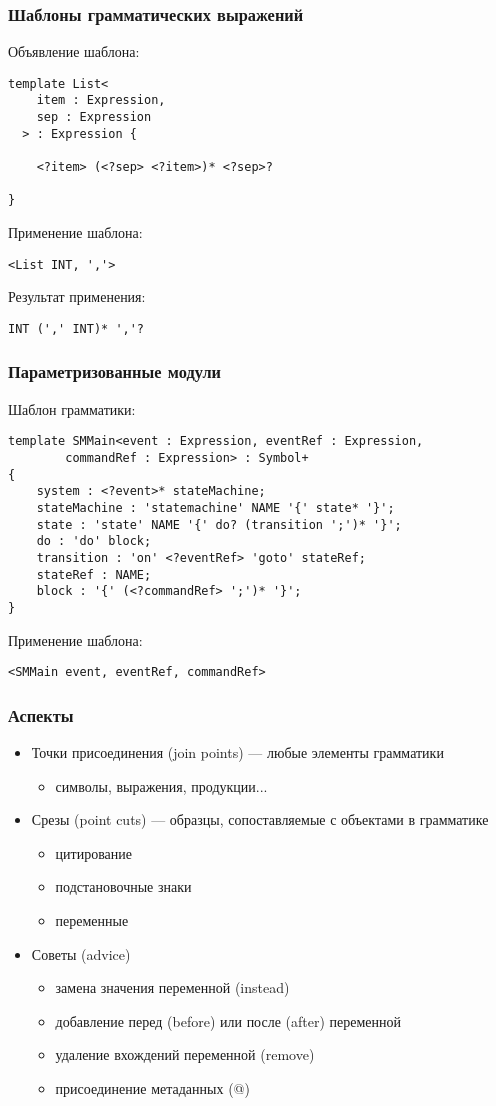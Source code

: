 \documentclass{beamer}
\begin{document}
\begin{frame}[fragile]
	\frametitle{Шаблоны грамматических выражений}
Объявление шаблона:
\begin{lstlisting}
template List<
    item : Expression, 
    sep : Expression
  > : Expression {
  
    <?item> (<?sep> <?item>)* <?sep>?
    
}
\end{lstlisting}
Применение шаблона:
\begin{lstlisting}
<List INT, ','>
\end{lstlisting}
Результат применения:
\begin{lstlisting}
INT (',' INT)* ','?
\end{lstlisting}
\end{frame}

\begin{frame}[fragile]
	\frametitle{Параметризованные модули}
Шаблон грамматики:
\begin{lstlisting}[xleftmargin=0.3cm]
template SMMain<event : Expression, eventRef : Expression, 
        commandRef : Expression> : Symbol+ 
{
    system : <?event>* stateMachine;
    stateMachine : 'statemachine' NAME '{' state* '}';
    state : 'state' NAME '{' do? (transition ';')* '}';
    do : 'do' block;
    transition : 'on' <?eventRef> 'goto' stateRef;
    stateRef : NAME;
    block : '{' (<?commandRef> ';')* '}';
}
\end{lstlisting}
Применение шаблона:
\begin{lstlisting}[xleftmargin=0.3cm]
<SMMain event, eventRef, commandRef>
\end{lstlisting}
\end{frame}

\begin{frame}[fragile]
	\frametitle{Аспекты}
\begin{itemize}
\item Точки присоединения (join points) --- любые элементы грамматики
	\begin{itemize}
		\item символы, выражения, продукции...
	\end{itemize}
\item Срезы (point cuts) --- образцы, сопоставляемые с объектами в грамматике
	\begin{itemize}
		\item цитирование
		\item подстановочные знаки
		\item переменные
	\end{itemize}
\item Советы (advice)
	\begin{itemize}
		\item замена значения переменной (instead)
		\item добавление перед (before) или после (after) переменной
		\item удаление вхождений переменной (remove)
		\item присоединение метаданных (@)
	\end{itemize}
\end{itemize}	
\end{frame}
\end{document}
